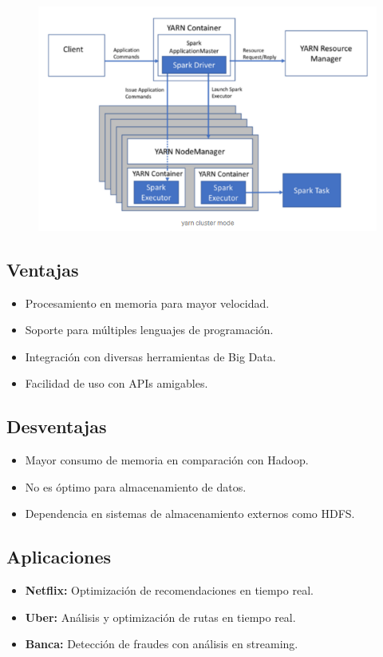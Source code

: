 \documentclass[12pt]{article}
\begin{document}
\begin{figure}[h!]
    \centering
    \includegraphics[width=.7\textwidth]{esquema-spark.png}
    \label{fig:my_label}
\end{figure}

\subsection{Ventajas}
\begin{itemize}
    \item Procesamiento en memoria para mayor velocidad.
    \item Soporte para múltiples lenguajes de programación.
    \item Integración con diversas herramientas de Big Data.
    \item Facilidad de uso con APIs amigables.
\end{itemize}

\subsection{Desventajas}
\begin{itemize}
    \item Mayor consumo de memoria en comparación con Hadoop.
    \item No es óptimo para almacenamiento de datos.
    \item Dependencia en sistemas de almacenamiento externos como HDFS.
\end{itemize}

\subsection{Aplicaciones}
\begin{itemize}
    \item \textbf{Netflix:} Optimización de recomendaciones en tiempo real.
    \item \textbf{Uber:} Análisis y optimización de rutas en tiempo real.
    \item \textbf{Banca:} Detección de fraudes con análisis en streaming.
\end{itemize}
\end{document}
